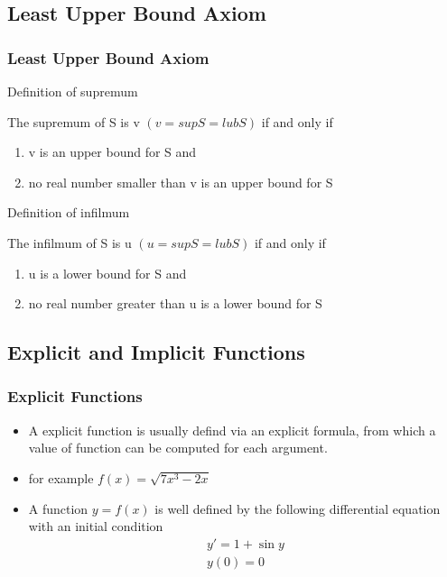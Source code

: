 \documentclass[notheorems,mathserif,table,compress]{beamer}  %
\begin{document}
\subsection{Least Upper Bound Axiom}
\begin{frame}
  \frametitle{Least Upper Bound Axiom}
  \begin{description}
 \item Definition  of  supremum

      The supremum of S is v $(v=supS=lubS)$ if  and only if

     \begin{enumerate}
       \item v is  an upper bound for S and
        \item no real  number smaller than v is  an upper bound for S
    \end{enumerate}
 
 \item Definition  of  infilmum 

      The infilmum of S is u $(u=supS=lubS)$ if  and only if

    \begin{enumerate}
     \item  u is a lower bound for S and
      \item no  real  number  greater  than  u is  a lower bound for S
     \end{enumerate}
\end{description}
\end{frame}

\subsection{Explicit and Implicit Functions}
\begin{frame}
  \frametitle{Explicit Functions}
  \begin{itemize}
\item A explicit function is usually defind via an explicit formula, from which a value of function can be computed for each  argument.
\item  for  example  $f(x)=\sqrt{7x^3-2x}$
\item A function $y=f(x)$ is well defined  by  the following  differential equation  with  an  initial  condition 
\begin{displaymath}
\begin{array}{ll}
y'=1+\sin y\\
 y(0)=0\\
\end{array} %
\end{displaymath}
\end{itemize}
\end{frame}
\end{document}
